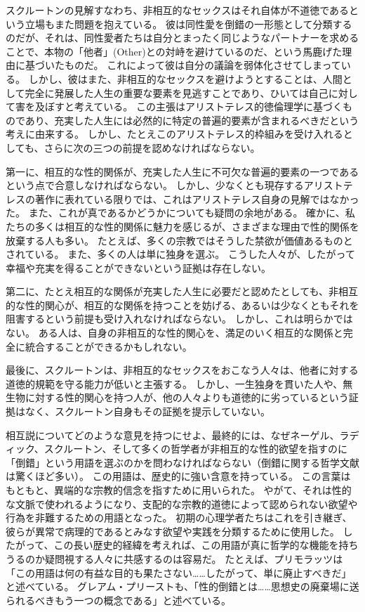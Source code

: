 \documentclass[paper=a4,book,openany]{jlreq} \usepackage{mystyle}
\begin{document}
スクルートンの見解{\DDASH}すなわち、非相互的なセックスはそれ自体が不道徳であるという立場{\DDASH}もまた問題を抱えている。
彼は同性愛を倒錯の一形態として分類するのだが、それは、同性愛者たちは自分とまったく同じようなパートナーを求めることで、本物の「他者」(Other)との対峙を避けているのだ、という馬鹿げた理由に基づいたものだ。
これによって彼は自分の議論を弱体化させてしまっている。
しかし、彼はまた、非相互的なセックスを避けようとすることは、人間として完全に発展した人生の重要な要素を見逃すことであり、ひいては自己に対して害を及ぼすと考えている。
この主張はアリストテレス的徳倫理学に基づくものであり、充実した人生には必然的に特定の普遍的要素が含まれるべきだという考えに由来する。
しかし、たとえこのアリストテレス的枠組みを受け入れるとしても、さらに次の三つの前提を認めなければならない。

第一に、相互的な性的関係が、充実した人生に不可欠な普遍的要素の一つであるという点で合意しなければならない。
しかし、少なくとも現存するアリストテレスの著作に表れている限りでは、これはアリストテレス自身の見解ではなかった。
また、これが真であるかどうかについても疑問の余地がある。
確かに、私たちの多くは相互的な性的関係に魅力を感じるが、さまざまな理由で性的関係を放棄する人も多い。
たとえば、多くの宗教ではそうした禁欲が価値あるものとされている。
また、多くの人は単に独身を選ぶ。
こうした人々が、したがって幸福や充実を得ることができないという証拠は存在しない。

第二に、たとえ相互的な関係が充実した人生に必要だと認めたとしても、非相互的な性的関心が、相互的な関係を持つことを妨げる、あるいは少なくともそれを阻害するという前提も受け入れなければならない。
しかし、これは明らかではない。
ある人は、自身の非相互的な性的関心を、満足のいく相互的な関係と完全に統合することができるかもしれない。

最後に、スクルートンは、非相互的なセックスをおこなう人々は、他者に対する道徳的規範を守る能力が低いと主張する。
しかし、一生独身を貫いた人や、無生物に対する性的関心を持つ人が、他の人々よりも道徳的に劣っているという証拠はなく、スクルートン自身もその証拠を提示していない。

相互説についてどのような意見を持つにせよ、最終的には、なぜネーゲル、ラディック、スクルートン、そして多くの哲学者が非相互的な性的欲望を指すのに「倒錯」という用語を選ぶのかを問わなければならない（倒錯に関する哲学文献は驚くほど多い）。
この用語は、歴史的に強い含意を持っている。
この言葉はもともと、異端的な宗教的信念を指すために用いられた。
やがて、それは性的な文脈で使われるようになり、支配的な宗教的道徳によって認められない欲望や行為を非難するための用語となった。
初期の心理学者たちはこれを引き継ぎ、彼らが異常で病理的であるとみなす欲望や実践を分類するために使用した。
したがって、この長い歴史的経緯を考えれば、この用語が真に哲学的な機能を持ちうるのか疑問視する人々に共感するのは容易だ。
たとえば、プリモラッツは「この用語は何の有益な目的も果たさない……したがって、単に廃止すべきだ」と述べている\citep[p.64]{primoratz99:_ethic_and_sex}。
グレアム・プリーストも、「性的倒錯とは……思想史の廃棄場に送られるべきもう一つの概念である」と述べている\citep[p.371]{priest97:_sexual_perver}。
\end{document}

